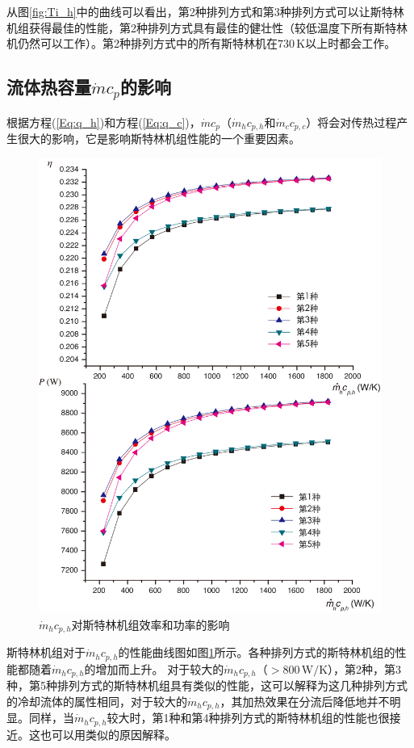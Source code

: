 从图\ref{fig:Ti_h}中的曲线可以看出，第2种排列方式和第3种排列方式可以让斯特林机组获得最佳的性能，第2种排列方式具有最佳的健壮性（较低温度下所有斯特林机仍然可以工作）。第2种排列方式中的所有斯特林机在$730\,\mathrm{K}$以上时都会工作。

\subsection{流体热容量$\dot{m}c_p$的影响}

根据方程(\ref{Eq:q_h})和方程(\ref{Eq:q_c})，$\dot{m}c_p$（$\dot{m}_hc_{p,h}$和$\dot{m}_cc_{p,c}$）将会对传热过程产生很大的影响，它是影响斯特林机组性能的一个重要因素。

\noindent \begin{figure}[htbp]
\begin{center}
	\includegraphics[width = 0.7\columnwidth]{fig/qm_hcp_h}
	\caption{$\dot{m}_hc_{p,h}$对斯特林机组效率和功率的影响}
	\label{fig:qm_hcp_h}
\end{center}
\end{figure}
斯特林机组对于$\dot{m}_hc_{p,h}$的性能曲线图如图\ref{fig:qm_hcp_h}所示。各种排列方式的斯特林机组的性能都随着$\dot{m}_hc_{p,h}$的增加而上升。
对于较大的$\dot{m}_hc_{p,h}$（$> 800\,\mathrm{W/K}$），第2种，第3种，第5种排列方式的斯特林机组具有类似的性能，这可以解释为这几种排列方式的冷却流体的属性相同，对于较大的$\dot{m}_hc_{p,h}$，其加热效果在分流后降低地并不明显。同样，当$\dot{m}_hc_{p,h}$较大时，第1种和第4种排列方式的斯特林机组的性能也很接近。这也可以用类似的原因解释。

